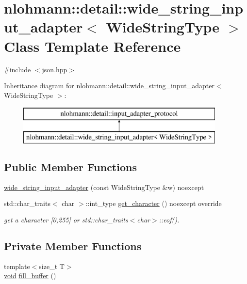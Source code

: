 \hypertarget{classnlohmann_1_1detail_1_1wide__string__input__adapter}{}\section{nlohmann\+::detail\+::wide\+\_\+string\+\_\+input\+\_\+adapter$<$ Wide\+String\+Type $>$ Class Template Reference}
\label{classnlohmann_1_1detail_1_1wide__string__input__adapter}


{\ttfamily \#include $<$json.\+hpp$>$}

Inheritance diagram for nlohmann\+::detail\+::wide\+\_\+string\+\_\+input\+\_\+adapter$<$ Wide\+String\+Type $>$\+:\begin{figure}[H]
\begin{center}
\leavevmode
\includegraphics[height=2.000000cm]{d1/dea/classnlohmann_1_1detail_1_1wide__string__input__adapter}
\end{center}
\end{figure}
\subsection*{Public Member Functions}
\begin{DoxyCompactItemize}
\item 
\mbox{\hyperlink{classnlohmann_1_1detail_1_1wide__string__input__adapter_a85c8bddae20bc00d64dd7a2c87109357}{wide\+\_\+string\+\_\+input\+\_\+adapter}} (const Wide\+String\+Type \&w) noexcept
\item 
std\+::char\+\_\+traits$<$ char $>$\+::int\+\_\+type \mbox{\hyperlink{classnlohmann_1_1detail_1_1wide__string__input__adapter_abb62b34cf77e557ce5321b7f2490c3b0}{get\+\_\+character}} () noexcept override
\begin{DoxyCompactList}\small\item\em get a character \mbox{[}0,255\mbox{]} or std\+::char\+\_\+traits$<$char$>$\+::eof(). \end{DoxyCompactList}\end{DoxyCompactItemize}
\subsection*{Private Member Functions}
\begin{DoxyCompactItemize}
\item 
{\footnotesize template$<$size\+\_\+t T$>$ }\\\mbox{\hyperlink{namespacenlohmann_1_1detail_a59fca69799f6b9e366710cb9043aa77d}{void}} \mbox{\hyperlink{classnlohmann_1_1detail_1_1wide__string__input__adapter_ab718e44c524fa7ec74b0a0ae1ad64ca4}{fill\+\_\+buffer}} ()
\end{DoxyCompactItemize}
